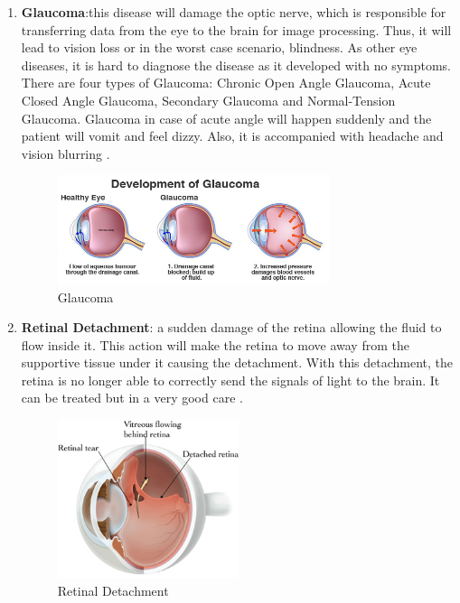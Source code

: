 \begin{enumerate}
\item \textbf{Glaucoma}:this disease will damage the optic nerve, which is responsible for transferring data from the eye to the brain for image processing.
Thus, it will lead to vision loss or in the worst case scenario, blindness.
As other eye diseases, it is hard to diagnose the disease as it developed with no symptoms.
There are four types of Glaucoma: Chronic Open Angle Glaucoma, Acute Closed Angle Glaucoma, Secondary Glaucoma and Normal-Tension Glaucoma.
Glaucoma in case of acute angle will happen suddenly and the patient will vomit and feel dizzy. Also, it is accompanied with headache and vision blurring \cite{group1998comparison}.
\begin{figure}[htb]
        \centering
        \includegraphics[width=0.75\textwidth]{figures/Glaucoma.jpg} %
  \caption{Glaucoma \cite{Glaucoma}}
  \label{fig:Glaucoma}
\end{figure}

\item \textbf{Retinal Detachment}: a sudden damage of the retina allowing the fluid to flow inside it.
This action will make the retina to move away from the supportive tissue under it causing the detachment.
With this detachment, the retina is no longer able to correctly send the signals of light to the brain.
It can be treated but in a very good care \cite{retina1983classification}.
\begin{figure}[htb]
        \centering
        \includegraphics[width=0.5\textwidth]{figures/retinaldetachment.jpg} %
  \caption{Retinal Detachment \cite{retinaldetachment}}
  \label{fig:Glaucoma}
\end{figure}
\end{enumerate}
 
